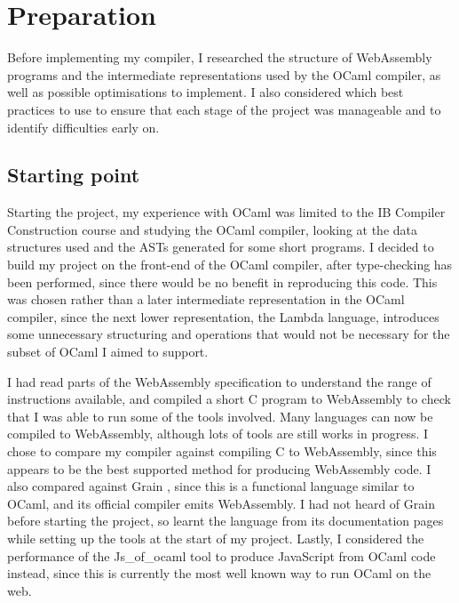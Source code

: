 \chapter{Preparation} %


Before implementing my compiler, I researched the structure of WebAssembly programs and the intermediate representations used by the OCaml compiler, as well as possible optimisations to implement. I also considered which best practices to use to ensure that each stage of the project was manageable and to identify difficulties early on.

\section{Starting point}
Starting the project, my experience with OCaml was limited to the IB Compiler Construction course and studying the OCaml compiler, looking at the data structures used and the ASTs generated for some short programs. I decided to build my project on the front-end of the OCaml compiler, after type-checking has been performed, since there would be no benefit in reproducing this code. This was chosen rather than a later intermediate representation in the OCaml compiler, since the next lower representation, the Lambda language, introduces some unnecessary structuring and operations that would not be necessary for the subset of OCaml I aimed to support. 

I had read parts of the WebAssembly specification to understand the range of instructions available, and compiled a short C program to WebAssembly to check that I was able to run some of the tools involved.
Many languages can now be compiled to WebAssembly, although lots of tools are still works in progress. I chose to compare my compiler against compiling C to WebAssembly, since this appears to be the best supported method for producing WebAssembly code. I also compared against Grain \cite{grain}, since this is a functional language similar to OCaml, and its official compiler emits WebAssembly. I had not heard of Grain before starting the project, so learnt the language from its documentation pages while setting up the tools at the start of my project. Lastly, I considered the performance of the Js\_of\_ocaml tool to produce JavaScript from OCaml code instead, since this is currently the most well known way to run OCaml on the web.

